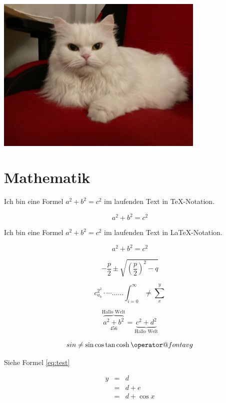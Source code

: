 \documentclass[12pt,ngerman,parskip=half]{scrreprt} %
\makeatletter
\newcommand*{\avg}{\mathop{\operator@font avg}}
\makeatother
\begin{document}
\blindtext

\blindtext


\begin{center}
\includegraphics[width=0.75\textwidth]{./Bilder/Katze/Katze2.jpg}
\label{fig:katze2}
\end{center}


\chapter{Mathematik}

Ich bin eine Formel $a^2+b^2=c^2$ im laufenden Text in TeX-Notation.

$$a^2+b^2=c^2$$

Ich bin eine Formel \(a^2+b^2=c^2\) im laufenden Text in LaTeX-Notation.

\[a^2+b^2=c^2\]

\begin{equation}
- \frac{p}{2} \pm \sqrt{ \left(\frac{p}{2}\right)^2 - q }
\end{equation}

\begin{equation}
c_{a_b}^{2^2} \cdot \cdots \dots \ldots \int_{i=0}^{\infty} \not= \sum_{x}^{y}
\end{equation}


\begin{equation}
\overbrace{a^2 + b^2}^{\text{Hallo Welt}}_{456} =\underbrace{c^2 + d^2}_{\mbox{Hallo Welt}}
\end{equation}

\begin{equation}
sin \not= \sin \cos \tan \cosh \avg
\end{equation}

Siehe Formel \ref{eq:test}

\begin{eqnarray}
y  &=& d \\
  &=& d + e\\\label{eq:test}
  &=& d + \cos x \\
\end{eqnarray}
\end{document}
